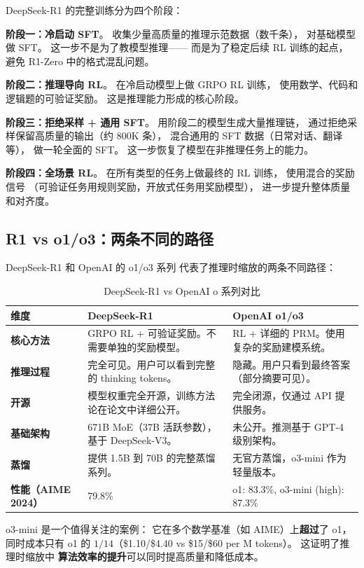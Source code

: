 DeepSeek-R1 的完整训练分为四个阶段：

\textbf{阶段一：冷启动 SFT}。
收集少量高质量的推理示范数据（数千条），
对基础模型做 SFT。
这一步不是为了教模型推理——
而是为了稳定后续 RL 训练的起点，
避免 R1-Zero 中的格式混乱问题。

\textbf{阶段二：推理导向 RL}。
在冷启动模型上做 GRPO RL 训练，
使用数学、代码和逻辑题的可验证奖励。
这是推理能力形成的核心阶段。

\textbf{阶段三：拒绝采样 + 通用 SFT}。
用阶段二的模型生成大量推理链，
通过拒绝采样保留高质量的输出（约 800K 条），
混合通用的 SFT 数据（日常对话、翻译等），
做一轮全面的 SFT。
这一步恢复了模型在非推理任务上的能力。

\textbf{阶段四：全场景 RL}。
在所有类型的任务上做最终的 RL 训练，
使用混合的奖励信号
（可验证任务用规则奖励，开放式任务用奖励模型），
进一步提升整体质量和对齐度。

\subsection{R1 vs o1/o3：两条不同的路径}

DeepSeek-R1 和 OpenAI 的 o1/o3 系列
代表了推理时缩放的两条不同路径：

\begin{table}[H]
\centering\small
\caption{DeepSeek-R1 vs OpenAI o 系列对比}
\begin{tabularx}{\linewidth}{l X X}
\toprule
\textbf{维度} & \textbf{DeepSeek-R1} & \textbf{OpenAI o1/o3} \\
\midrule
\textbf{核心方法} & GRPO RL + 可验证奖励。不需要单独的奖励模型。 & RL + 详细的 PRM。使用复杂的奖励建模系统。 \\
\textbf{推理过程} & 完全可见。用户可以看到完整的 thinking tokens。 & 隐藏。用户只看到最终答案（部分摘要可见）。 \\
\textbf{开源} & 模型权重完全开源，训练方法论在论文中详细公开。 & 完全闭源，仅通过 API 提供服务。 \\
\textbf{基础架构} & 671B MoE（37B 活跃参数），基于 DeepSeek-V3。 & 未公开。推测基于 GPT-4 级别架构。 \\
\textbf{蒸馏} & 提供 1.5B 到 70B 的完整蒸馏系列。 & 无官方蒸馏，o3-mini 作为轻量版本。 \\
\textbf{性能（AIME 2024）} & 79.8\% & o1: 83.3\%, o3-mini (high): 87.3\% \\
\bottomrule
\end{tabularx}
\end{table}

o3-mini 是一个值得关注的案例：
它在多个数学基准（如 AIME）上\textbf{超过}了 o1，
同时成本只有 o1 的 $1/14$（\$1.10/\$4.40 vs \$15/\$60 per M tokens）。
这证明了推理时缩放中
\textbf{算法效率的提升}可以同时提高质量和降低成本。

